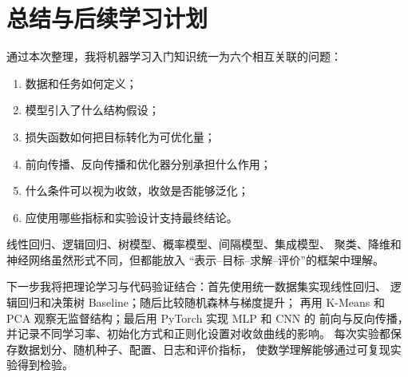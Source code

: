 \documentclass[UTF8,zihao=-4,a4paper,fontset=windows]{ctexart}
\begin{document}
\section{总结与后续学习计划}

通过本次整理，我将机器学习入门知识统一为六个相互关联的问题：
\begin{enumerate}
  \item 数据和任务如何定义；
  \item 模型引入了什么结构假设；
  \item 损失函数如何把目标转化为可优化量；
  \item 前向传播、反向传播和优化器分别承担什么作用；
  \item 什么条件可以视为收敛，收敛是否能够泛化；
  \item 应使用哪些指标和实验设计支持最终结论。
\end{enumerate}
线性回归、逻辑回归、树模型、概率模型、间隔模型、集成模型、
聚类、降维和神经网络虽然形式不同，但都能放入
“表示--目标--求解--评价”的框架中理解。

下一步我将把理论学习与代码验证结合：首先使用统一数据集实现线性回归、
逻辑回归和决策树 Baseline；随后比较随机森林与梯度提升；
再用 K-Means 和 PCA 观察无监督结构；最后用 PyTorch 实现 MLP 和 CNN 的
前向与反向传播，并记录不同学习率、初始化方式和正则化设置对收敛曲线的影响。
每次实验都保存数据划分、随机种子、配置、日志和评价指标，
使数学理解能够通过可复现实验得到检验。
\end{document}
